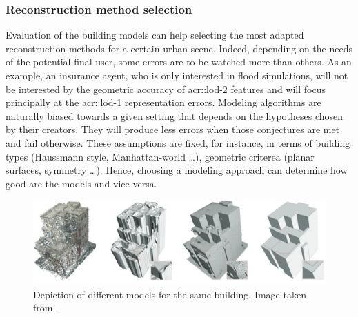         \subsubsection{Reconstruction method selection}
            Evaluation of the building models can help selecting the most adapted reconstruction methods for a certain urban scene.
            Indeed, depending on the needs of the potential final user, some errors are to be watched more than others.
            As an example, an insurance agent, who is only interested in flood simulations, will not be interested by the geometric accuracy of \gls{acr::lod}-2 features and will focus principally at the \gls{acr::lod}-1 representation errors.
            Modeling algorithms are naturally biased towards a given setting that depends on the hypotheses chosen by their creators.
            They will produce less errors when those conjectures are met and fail otherwise.
            These assumptions are fixed, for instance, in terms of building types (Haussmann style, Manhattan-world \dots), geometric criterea (planar surfaces, symmetry \dots).
            Hence, choosing a modeling approach can determine how good are the models and vice versa.
            \begin{figure}[htpb]
                \centering
                \includegraphics[width=.7\textwidth]{images/introduction/use/comparison_li}
                \caption[
                    Depiction of different models for the same building.
                ]{
                    \label{fig::comparison}
                    Depiction of different models for the same building.
                    Image taken from~\parencite{li2016manhattan}.
                }
            \end{figure}

